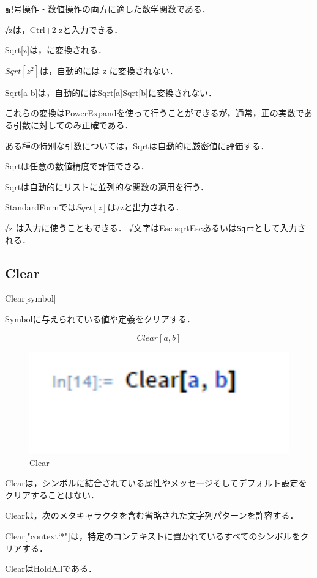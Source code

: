 記号操作・数値操作の両方に適した数学関数である．

√zは，Ctrl+2 zと入力できる．

Sqrt[z]は，に変換される．

$Sqrt[z^2]$は，自動的には z に変換されない．

Sqrt[a b]は，自動的にはSqrt[a]Sqrt[b]に変換されない．

これらの変換はPowerExpandを使って行うことができるが，通常，正の実数である引数に対してのみ正確である．

ある種の特別な引数については，Sqrtは自動的に厳密値に評価する．

Sqrtは任意の数値精度で評価できる．

Sqrtは自動的にリストに並列的な関数の適用を行う．

StandardFormでは$Sqrt[z]$は√zと出力される．

√z は入力に使うこともできる． √文字はEsc sqrtEscあるいは\verb|Sqrt|として入力される．


\subsection {Clear}

Clear[symbol]

Symbolに与えられている値や定義をクリアする．

\[Clear[a,b]\]

\begin{figure}[h]
\centering
\includegraphics[width=15cm]{clear.png}
\caption{Clear}\label{図}
\end{figure}

Clearは，シンボルに結合されている属性やメッセージそしてデフォルト設定をクリアすることはない．

Clearは，次のメタキャラクタを含む省略された文字列パターンを許容する．

Clear["context`*"]は，特定のコンテキストに置かれているすべてのシンボルをクリアする．

ClearはHoldAllである．

